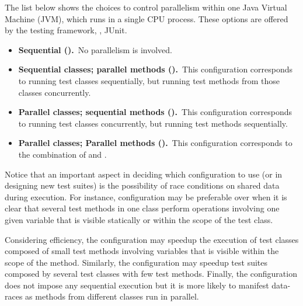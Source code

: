The list below shows the choices to control parallelism within one
Java Virtual Machine (JVM), which runs in a single CPU process.  These
options are offered by the testing framework, \eg{}, JUnit.

\begin{itemize}
\item
    \textbf{Sequential (\Seq).}~No parallelism is involved.
\item
    \textbf{Sequential classes; parallel methods
      (\SeqClassParMeth).}~This configuration corresponds to running
    test classes sequentially, but running test methods from those
    classes concurrently.
\item
    \textbf{Parallel classes; sequential methods
      (\ParClassSeqMeth{}).}~This configuration corresponds to running
    test classes concurrently, but running test methods sequentially.
\item
    \textbf{Parallel classes; Parallel methods
      (\ParClassParMeth).}~This configuration corresponds to the
    combination of \SeqClassParMeth{} and \ParClassSeqMeth{}.  
\end{itemize}


Notice that an important aspect in deciding which configuration to use
(or in designing new test suites) is the possibility of race
conditions on shared data during execution. For instance,
configuration \ParClassSeqMeth{} may be preferable over
\SeqClassParMeth{} when it is clear that several test methods in one
class perform operations involving one given variable that is visible
statically or within the scope of the test class.

Considering efficiency, the configuration \SeqClassParMeth{} may
speedup the execution of test classes composed of small test methods
involving variables that is visible within the scope of the method.
Similarly, the configuration \ParClassSeqMeth{} may speedup
test suites composed by several test classes with few test methods.
Finally, the configuration \ParClassParMeth{} does not impose any 
sequential execution but it is more likely to manifest data-races as 
methods from different classes run in parallel.

